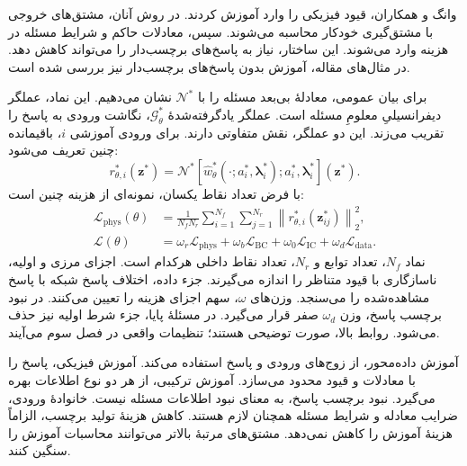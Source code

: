 \label{sec:lit-physics-informed-deeponet}

وانگ و همکاران، قیود فیزیکی را وارد آموزش  کردند.
در روش آنان، مشتق‌های خروجی با مشتق‌گیری خودکار محاسبه می‌شوند.
سپس، معادلات حاکم و شرایط مسئله در هزینه وارد می‌شوند.
این ساختار، نیاز به پاسخ‌های برچسب‌دار را می‌تواند کاهش دهد.
در مثال‌های مقاله، آموزش بدون پاسخ‌های برچسب‌دار نیز بررسی شده است.
\cite{wang2021pideeponet}

برای بیان عمومی، معادلهٔ بی‌بعد مسئله را با $\mathcal{N}^{*}$ نشان می‌دهیم.
این نماد، عملگر دیفرانسیلیِ معلومِ مسئله است.
عملگر یادگرفته‌شدهٔ $\mathcal{G}^{*}_{\theta}$، نگاشت ورودی به پاسخ را تقریب می‌زند.
این دو عملگر، نقش متفاوتی دارند.
برای ورودی آموزشی $i$، باقیمانده چنین تعریف می‌شود:
\begin{equation}
r^{*}_{\theta,i}(\mathbf{z}^{*})
=\mathcal{N}^{*}\!\left[
\widehat{w}^{*}_{\theta}(\cdot;a_i^{*},\boldsymbol{\lambda}_i^{*});
a_i^{*},\boldsymbol{\lambda}_i^{*}
\right](\mathbf{z}^{*}).
\label{eq:lit-operator-physical-residual}
\end{equation}
با فرض تعداد نقاط یکسان، نمونه‌ای از هزینه چنین است:
\begin{equation}
\begin{aligned}
\mathcal{L}_{\mathrm{phys}}(\theta)
&=\frac{1}{N_fN_r}\sum_{i=1}^{N_f}\sum_{j=1}^{N_r}
\left\|r^{*}_{\theta,i}(\mathbf{z}^{*}_{ij})\right\|_2^2,\\
\mathcal{L}(\theta)
&=\omega_r\mathcal{L}_{\mathrm{phys}}
+\omega_b\mathcal{L}_{\mathrm{BC}}
+\omega_0\mathcal{L}_{\mathrm{IC}}
+\omega_d\mathcal{L}_{\mathrm{data}}.
\end{aligned}
\label{eq:lit-operator-physical-loss}
\end{equation}
نماد $N_f$، تعداد توابع و $N_r$، تعداد نقاط داخلی هرکدام است.
اجزای مرزی و اولیه، ناسازگاری با قیود متناظر را اندازه می‌گیرند.
جزء داده، اختلاف پاسخ شبکه با پاسخ مشاهده‌شده را می‌سنجد.
وزن‌های $\omega$، سهم اجزای هزینه را تعیین می‌کنند.
در نبود برچسب پاسخ، وزن $\omega_d$ صفر قرار می‌گیرد.
در مسئلهٔ پایا، جزء شرط اولیه نیز حذف می‌شود.
روابط بالا، صورت توضیحی هستند؛ تنظیمات واقعی در فصل سوم می‌آیند.

آموزش داده‌محور، از زوج‌های ورودی و پاسخ استفاده می‌کند.
آموزش فیزیکی، پاسخ را با معادلات و قیود محدود می‌سازد.
آموزش ترکیبی، از هر دو نوع اطلاعات بهره می‌گیرد.
نبود برچسب پاسخ، به معنای نبود اطلاعات مسئله نیست.
خانوادهٔ ورودی، ضرایب معادله و شرایط مسئله همچنان لازم هستند.
کاهش هزینهٔ تولید برچسب، الزاماً هزینهٔ آموزش را کاهش نمی‌دهد.
مشتق‌های مرتبهٔ بالاتر می‌توانند محاسبات آموزش را سنگین کنند.
\cite{wang2021pideeponet}

